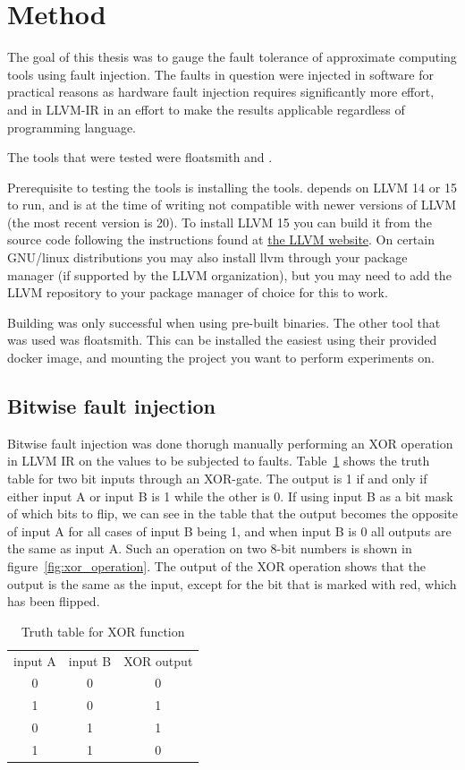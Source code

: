 \section{Method}

The goal of this thesis was to gauge the fault tolerance of approximate computing tools using fault injection. The faults in question were injected in software for practical reasons as hardware fault injection requires significantly more effort, and in LLVM-IR in an effort to make the results applicable regardless of programming language.

The tools that were tested were floatsmith and \taffo{}.

Prerequisite to testing the tools is installing the tools. \taffo{} depends on LLVM 14 or 15 to run, and is at the time of writing not compatible with newer versions of LLVM (the most recent version is 20). To install LLVM 15 you can build it from the source code following the instructions found at \href{llvm.org}{the LLVM website}. On certain GNU/linux distributions you may also install llvm through your package manager (if supported by the LLVM organization), but you may need to add the LLVM repository  to your package manager of choice for this to work. 

Building \taffo{} was only successful when using pre-built binaries. 
The other tool that was used was floatsmith. This can be installed the easiest using their provided docker image, and mounting the project you want to perform experiments on.

\subsection{Bitwise fault injection}
Bitwise fault injection was done thorugh manually performing an XOR operation in LLVM IR on the values to be subjected to faults. Table~\ref{table:xor_truth_table} shows the truth table for two bit inputs through an XOR-gate. The output is 1 if and only if either input A or input B is 1 while the other is 0. If using input B as a bit mask of which bits to flip, we can see in the table that the output becomes the opposite of input A for all cases of input B being 1, and when input B is 0 all outputs are the same as input A. Such an operation on two 8-bit numbers is shown in figure~\ref{fig:xor_operation}. The output of the XOR operation shows that the output is the same as the input, except for the bit that is marked with red, which has been flipped.

\begin{table}[htb]
    \centering
\caption{Truth table for XOR function}
    \label{table:xor_truth_table}
\begin{tabular}{c|c|c}\label{table:xor_truth_table}
     input A& input B& XOR output \\
     0&0&0\\
     1&0&1\\
     0&1&1\\
     1&1&0
\end{tabular}
    
\end{table}



